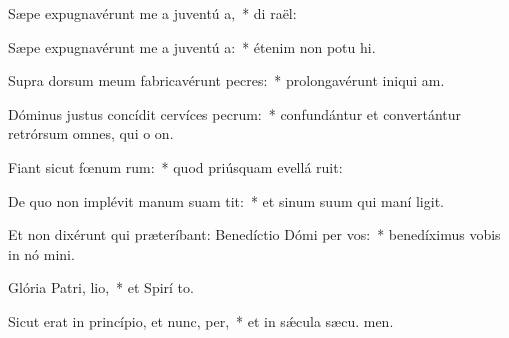 \item Sæpe expugnavérunt me a juventú a,~* di  raël:
\item Sæpe expugnavérunt me a juventú a:~* étenim non potu hi.
\item Supra dorsum meum fabricavérunt pecres:~* prolongavérunt iniqui am.
\item Dóminus justus concídit cervíces pecrum:~* confundántur et convertántur retrórsum omnes, qui o on.
\item Fiant sicut fœnum rum:~* quod priúsquam evellá ruit:
\item De quo non implévit manum suam  tit:~* et sinum suum qui maní ligit.
\item Et non dixérunt qui præteríbant: Benedíctio Dómi per vos:~* benedíximus vobis in nó mini.
\item Glória Patri,  lio,~* et Spirí to.
\item Sicut erat in princípio, et nunc,  per,~* et in sǽcula sæcu. men.
